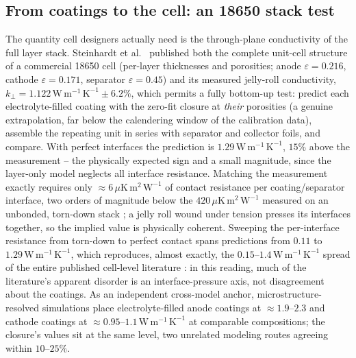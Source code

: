 \documentclass[10pt,a4paper]{article}
\newcommand{\WmK}{\,\mathrm{W\,m^{-1}\,K^{-1}}}
\begin{document}
\subsection{From coatings to the cell: an 18650 stack test}
\label{sec:results:stack}

The quantity cell designers actually need is the through-plane conductivity of the full layer stack. Steinhardt et al.\ \cite{steinhardt2021} published both the complete unit-cell structure of a commercial 18650 cell (per-layer thicknesses and porosities; anode $\varepsilon=0.216$, cathode $\varepsilon=0.171$, separator $\varepsilon=0.45$) and its measured jelly-roll conductivity, $k_\perp = 1.122\WmK \pm 6.2\%$, which permits a fully bottom-up test: predict each electrolyte-filled coating with the zero-fit closure at \emph{their} porosities (a genuine extrapolation, far below the calendering window of the calibration data), assemble the repeating unit in series with separator and collector foils, and compare. With perfect interfaces the prediction is $1.29\WmK$, $15\%$ above the measurement -- the physically expected sign and a small magnitude, since the layer-only model neglects all interface resistance. Matching the measurement exactly requires only $\approx6\,\mu\mathrm{K\,m^2\,W^{-1}}$ of contact resistance per coating/separator interface, two orders of magnitude below the $420\,\mu\mathrm{K\,m^2\,W^{-1}}$ measured on an unbonded, torn-down stack \cite{vishwakarma2015}; a jelly roll wound under tension presses its interfaces together, so the implied value is physically coherent. Sweeping the per-interface resistance from torn-down to perfect contact spans predictions from $0.11$ to $1.29\WmK$, which reproduces, almost exactly, the $0.15$--$1.4\WmK$ spread of the entire published cell-level literature \cite{steinhardt2022}: in this reading, much of the literature's apparent disorder is an interface-pressure axis, not disagreement about the coatings. As an independent cross-model anchor, microstructure-resolved simulations \cite{oehlerdiss} place electrolyte-filled anode coatings at $\approx1.9$--$2.3$ and cathode coatings at $\approx0.95$--$1.1\WmK$ at comparable compositions; the closure's values sit at the same level, two unrelated modeling routes agreeing within $10$--$25\%$.
\end{document}
